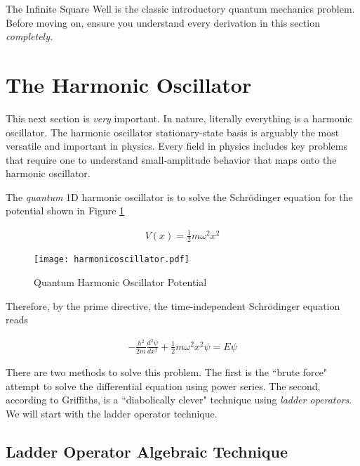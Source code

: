 The Infinite Square Well is the classic introductory quantum mechanics problem.
Before moving on, ensure you understand every derivation in this section
\textit{completely.} 

\section{The Harmonic Oscillator}

This next section is \textit{very} important. In nature, literally everything is
a harmonic oscillator. The harmonic oscillator stationary-state basis is
arguably the most versatile and important in physics. Every field in physics
includes key problems that require one to understand small-amplitude behavior
that maps onto the harmonic oscillator. 

The \textit{quantum} 1D harmonic oscillator is to solve the Schr\"odinger
equation for the potential shown in Figure \ref{fig:harmonicoscillator}

\begin{align} \label{HOpotential}
  V(x) = \frac{1}{2}m\omega^2 x^2
\end{align}\vspace{3px}

\begin{figure}[!ht]
  \centering
    \texttt{[image: harmonicoscillator.pdf]}
    \caption{Quantum Harmonic Oscillator Potential}
    \label{fig:harmonicoscillator}
\end{figure}

Therefore, by the prime directive, the time-independent Schr\"odinger equation
reads

\begin{align} \label{HOschr}
  -\frac{h^2}{2m} \frac{d^2 \psi}{d x^2} + \frac{1}{2}m\omega^2 x^2 \psi
  = E\psi
\end{align}\vspace{3px}

There are two methods to solve this problem. The first is the ``brute force"
attempt to solve the differential equation using power series. The second,
according to Griffiths, is a ``diabolically clever" technique using
\textit{ladder operators}. We will start with the ladder operator technique. 

\subsection{Ladder Operator Algebraic Technique}

